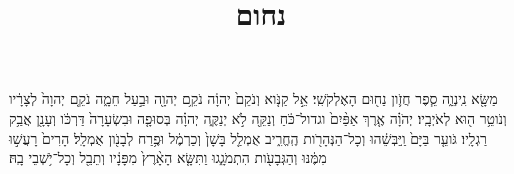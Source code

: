 \documentclass{openreader}
\title{נחום}
\date{}
\begin{document}
\maketitle
\raggedbottom 
\fontsize{16pt}{24pt}\selectfont


מַשָּׂ֖א נִֽינְוֵ֑ה סֵ֧פֶר חֲזֹ֛ון נַח֖וּם הָאֶלְקֹשִֽׁי׃ 
אֵ֣ל קַנֹּ֤וא וְנֹקֵם֙ יְהוָ֔ה נֹקֵ֥ם יְהוָ֖ה וּבַ֣עַל חֵמָ֑ה נֹקֵ֤ם יְהוָה֙ לְצָרָ֔יו וְנֹוטֵ֥ר ה֖וּא לְאֹיְבָֽיו׃ 
יְהֹוָ֗ה אֶ֤רֶךְ אַפַּ֨יִם֙ וגדול־כֹּ֔חַ וְנַקֵּ֖ה לֹ֣א יְנַקֶּ֑ה יְהוָ֗ה בְּסוּפָ֤ה וּבִשְׂעָרָה֙ דַּרְכֹּ֔ו וְעָנָ֖ן אֲבַ֥ק רַגְלָֽיו׃ 
גֹּועֵ֤ר בַּיָּם֙ וַֽיַּבְּשֵׁ֔הוּ וְכָל־הַנְּהָרֹ֖ות הֶֽחֱרִ֑יב אֻמְלַ֤ל בָּשָׁן֙ וְכַרְמֶ֔ל וּפֶ֥רַח לְבָנֹ֖ון אֻמְלָֽל׃ 
הָרִים֙ רָעֲשׁ֣וּ מִמֶּ֔נּוּ וְהַגְּבָעֹ֖ות הִתְמֹגָ֑גוּ וַתִּשָּׂ֤א הָאָ֨רֶץ֙ מִפָּנָ֔יו וְתֵבֵ֖ל וְכָל־יֹ֥שְׁבֵי בָֽהּ׃ 
\end{document}
